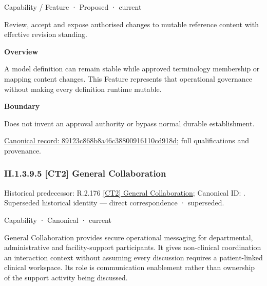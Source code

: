 \label{element:89123c868b8a46c38800916110cd918d}
{\small Capability / Feature · Proposed · current}\par

Review, accept and expose authorised changes to mutable reference content with effective revision standing.



\textbf{Overview}



A model definition can remain stable while approved terminology membership or mapping content changes. This Feature represents that operational governance without making every definition runtime mutable.



\textbf{Boundary}



Does not invent an approval authority or bypass normal durable establishment.


{\footnotesize \href{../../../../../../../continuum/strategy/capability/feature/89123c868b8a46c38800916110cd918d.md}{Canonical record: 89123c868b8a46c38800916110cd918d}; full qualifications and provenance.}\par
\subsubsection*{II.1.3.9.5 [CT2] General Collaboration}
\label{navigation:II.1.3.9.5}

{\small Historical predecessor: R.2.176 \hyperref[element:4f58c82aca7a4b54aeb6e2920ce5c12a]{[CT2] General Collaboration}; Canonical ID: \texttt{}. Superseded historical identity — direct correspondence · superseded.}\par
\label{element:3bb740e6db284112b054905c0c6c80be}
{\small Capability · Canonical · current}\par

General Collaboration provides secure operational messaging for departmental, administrative and facility-support participants. It gives non-clinical coordination an interaction context without assuming every discussion requires a patient-linked clinical workspace. Its role is communication enablement rather than ownership of the support activity being discussed.



